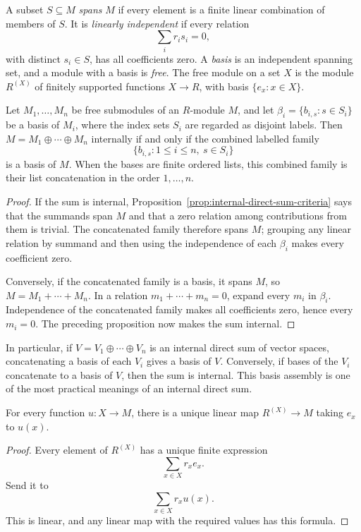 \begin{definition}
A subset \(S\subseteq M\) \emph{spans} \(M\) if every element is a finite
linear combination of members of \(S\). It is \emph{linearly independent}
if every relation
\[
\sum_i r_is_i=0,
\]
with distinct \(s_i\in S\), has all
coefficients zero. A \emph{basis} is an independent spanning set, and a
module with a basis is \emph{free}. The free module on a set \(X\) is the
module \(R^{(X)}\) of finitely supported functions \(X\to R\), with basis
\(\{e_x:x\in X\}\).
\end{definition}

\begin{theorem}
\label{thm:bases-internal-direct-sums}
Let \(M_1,\ldots,M_n\) be free submodules of an \(R\)-module \(M\), and let
\(\beta_i=\{b_{i,s}:s\in S_i\}\) be a basis of \(M_i\), where the index sets
\(S_i\) are regarded as disjoint labels. Then
\(M=M_1\oplus\cdots\oplus M_n\) internally if and only if the combined
labelled family
\[
\{b_{i,s}:1\leq i\leq n,\ s\in S_i\}
\]
is a basis of \(M\).  When the bases are finite ordered lists, this combined
family is their list concatenation in the order \(1,\ldots,n\).
\end{theorem}
\begin{proof}
If the sum is internal, Proposition~\ref{prop:internal-direct-sum-criteria}
says that the summands span \(M\) and that a zero relation among contributions
from them is trivial. The concatenated family therefore spans \(M\); grouping
any linear relation by summand and then using the independence of each
\(\beta_i\) makes every coefficient zero.

Conversely, if the concatenated family is a basis, it spans \(M\), so
\(M=M_1+\cdots+M_n\). In a relation \(m_1+\cdots+m_n=0\), expand every
\(m_i\) in \(\beta_i\). Independence of the concatenated family makes all
coefficients zero, hence every \(m_i=0\). The preceding proposition now makes
the sum internal.
\end{proof}

In particular, if \(V=V_1\oplus\cdots\oplus V_n\) is an internal direct sum
of vector spaces, concatenating a basis of each \(V_i\) gives a basis of
\(V\). Conversely, if bases of the \(V_i\) concatenate to a basis of \(V\),
then the sum is internal. This basis assembly is one of the most practical
meanings of an internal direct sum.

\begin{theorem}
For every function \(u:X\to M\), there is a unique linear map
\(R^{(X)}\to M\) taking \(e_x\) to \(u(x)\).
\end{theorem}
\begin{proof}
Every element of \(R^{(X)}\) has a unique finite expression
\[
\sum_{x\in X}r_xe_x.
\]
Send it to
\[
\sum_{x\in X}r_xu(x).
\]
This is linear, and any
linear map with the required values has this formula.
\end{proof}

